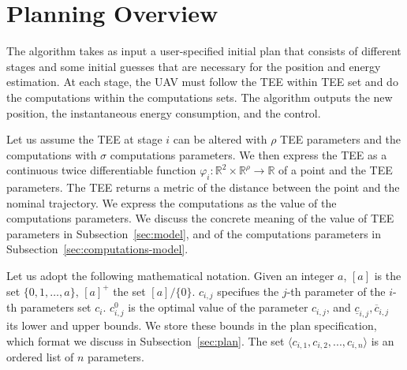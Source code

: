 \documentclass[letterpaper,10pt,conference]{ieeeconf}
\theoremstyle{definition}
\begin{document}
\section{Planning Overview}
\label{sec:prob}

The algorithm takes as input a user-specified initial plan that consists of different stages and some initial guesses that are necessary for the position and energy estimation. At each stage, the UAV must follow the TEE within TEE set and do the computations within the computations sets. The algorithm outputs the new position, the instantaneous energy consumption, and the control.

Let us assume the TEE at stage $i$ can be altered with $\rho$ TEE parameters and the computations with $\sigma$ computations parameters. We then express the TEE as a continuous twice differentiable function $\varphi_i:\mathbb{R}^2\times\mathbb{R}^\rho\rightarrow\mathbb{R}$ of a point and the TEE parameters. The TEE returns a metric of the distance between the point and the nominal trajectory. We express the computations as the value of the computations parameters. We discuss the concrete meaning of the value of TEE parameters in Subsection~\ref{sec:model}, and of the computations parameters in Subsection~\ref{sec:computations-model}. 

Let us adopt the following mathematical notation. Given an integer $a$, $[a]$ is the set $\{0,1,\dots,a\}$, $[a]^+$ the set $[a]/\{0\}$. $c_{i,j}$ specifues the $j$-th parameter of the $i$-th parameters set $c_i$. $c_{i,j}^0$ is the optimal value of the parameter $c_{i,j}$, and $\underline{c}_{i,j},\overline{c}_{i,j}$ its lower and upper bounds. We store these bounds in the plan specification, which format we discuss in Subsection~\ref{sec:plan}. The set $\langle c_{i,1},c_{i,2},...,c_{i,n}\rangle$ is an ordered list of $n$ parameters.
\end{document}
